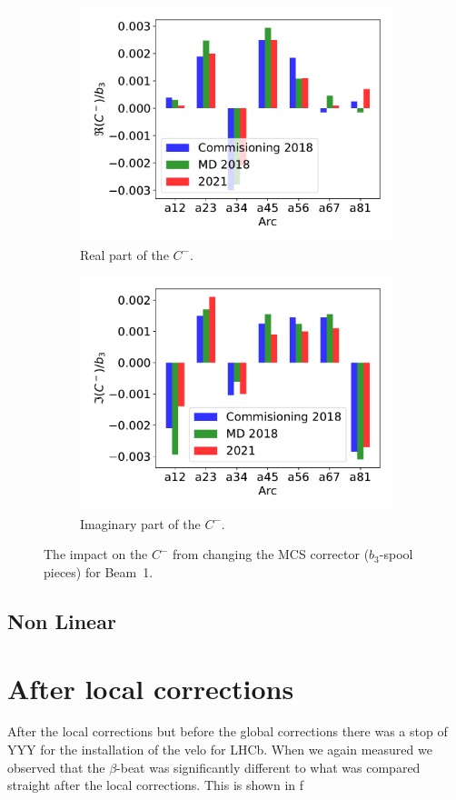 \documentclass{cernatsnote}
\begin{document}
\begin{figure}[ht]
\begin{subfigure}{.5\textwidth}
  \centering
  \includegraphics[width=.8\linewidth]{inj_linear/beamtest/MCS/b2_change_re_per_b3.pdf}  
  \caption{Real part of the $C^-$.}
\end{subfigure}
\begin{subfigure}{.5\textwidth}
  \centering
  \includegraphics[width=.8\linewidth]{inj_linear/beamtest/MCS/b_2change_im_per_b3.pdf}  
  \caption{Imaginary part of the $C^-$.}
\end{subfigure}
\caption{The impact on the $C^-$ from changing the MCS corrector ($b_3$-spool pieces) for Beam~1.}
\label{fig:beam2_mcs}
\end{figure}

\subsection{Non Linear}
\section{After local corrections}
After the local corrections but before the global corrections there was a stop of YYY for the installation of the velo for LHCb. When we again measured we observed that the $\beta$-beat was significantly different to what was compared straight after the local corrections. This is shown in f
\end{document}
